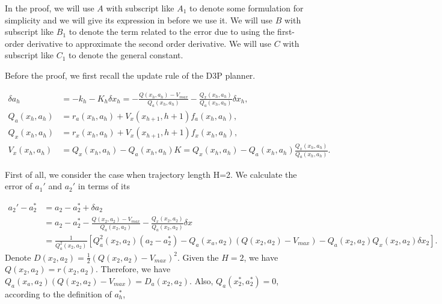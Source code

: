 \documentclass{article} %
\newcommand{\vmax}{V_{max}}
\begin{document}
In the proof, we will use $A$ with subscript like $A_1$ to denote some formulation for simplicity and we will give its expression in before we use it. We will use $B$ with subscript like $B_1$ to denote the term related to the error due to  using the first-order derivative   to approximate the second order derivative. We will use $C$ with subscript like $C_1$ to denote the general constant.

Before the proof, we first recall the update rule of the D3P planner.

\begin{align}
    \delta a_h  &= - k_h  - K_h \delta x_h  = -\frac{Q(x_h,a_h)- \vmax}{Q_a (x_h,a_h)} - \frac{Q_x(x_h,a_h)}{Q_a(x_h,a_h)}\delta x_h \label{eq:deltaa},\\
    Q_a(x_h, a_h) &= r_a(x_h,a_h) + V_x(x_{h+1}, h+1)f_a(x_h, a_h) \label{eq:qa},\\
    Q_x(x_h, a_h) &= r_x(x_h,a_h) + V_x(x_{h+1}, h+1)f_x(x_h, a_h)\label{eq:qx} ,\\
    V_x(x_h, a_h) &=  Q_x(x_h, a_h) - Q_a(x_h, a_h)K =  Q_x(x_h, a_h) - Q_a(x_h, a_h)\frac{Q_x(x_h,a_h)}{Q_a(x_h,a_h)}  \label{eq:vx}.
\end{align}

First of all, we consider the case when trajectory length H=2. We calculate the error of $a_1'$ and $a_2'$ in terms of its  


\begin{align}
    a_2' - a_2^* &= a_2 - a_2^* + \delta a_2 \\
                 &= a_2 - a_2^* - \frac{Q(x_2, a_2)- \vmax}{Q_a(x_2,a_2)} - \frac{Q_x(x_2,a_2)}{Q_a(x_2,a_2)}\delta x \\
                 &= \frac{1}{Q_a^2(x_2,a_2)}\left[ Q_a^2(x_2,a_2)(a_2-a_2^*) - Q_a(x_a, a_2)\left( Q(x_2,a_2) -\vmax \right) - Q_a(x_2,a_2)Q_x(x_2,a_2)\delta x_2 \right] \label{eq:a2}.
\end{align}
Denote $D(x_2,a_2)=\frac{1}{2}(Q(x_2,a_2)-\vmax)^2$. Given the $H=2$, we have $Q(x_2,a_2) = r(x_2,a_2)$. Therefore, we have $Q_a(x_a, a_2)\left( Q(x_2,a_2) -\vmax \right) =  D_a(x_2,a_2)  $.
Also, $Q_a(x_2^*,a_2^*) = 0$, according to the definition of $a_h^*$,
\end{document}
